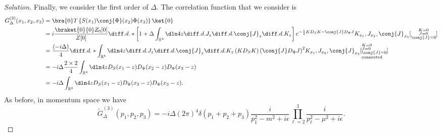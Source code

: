 \begin{proof}[Solution]
   Finally, we consider the first order of \(\Delta.\) The correlation function that we consider is
   \begin{align*}
      G_{\Delta}^{(3)}(x_1,x_2,x_3) &= \bra{0}T\left\{S(x_1)\conj{\Phi}(x_2) \Phi(x_3)\right\}\ket{0}\\
                                    &= i\frac{\braket{0}{0}Z_0[0]}{Z[0]} \diff.d.*{\left[1 + \Delta \int_{\mathbb{R}^4}\dln4z \diff.d.{}{J_z}\diff.d.{}{\conj{J}_z} \diff.d.{}{K_z}\right] e^{-\frac12 KD_SK - \conj{J}D_\Phi J}} {K_{x_1},J_{x_2},\conj{J}_{x_3}}[\substack{K=0\\J=0\\\conj{J}=0}]\\
                                    &= \frac{(-i\Delta)}{4} \diff.d.*{\int_{\mathbb{R}^4}\dln4z \diff.d.{}{J_z}\diff.d.{}{\conj{J}_z} \diff.d.{}{K_z}\left(KD_S K\right)\left(\conj{J}D_\Phi J\right)^2} {K_{x_1},J_{x_2},\conj{J}_{x_3}}[\begin{subarray}{l}K=0\\J=0\\\conj{J}=0\\\text{connected}\end{subarray}]\\
                                    &= -i \Delta \frac{2 \times 2}{4} \int_{\mathbb{R}^4} \dln4z D_S(x_1 - z) D_\Phi(x_2 - z) D_\Phi(x_3 - z)\\
                                    &= -i \Delta \int_{\mathbb{R}^4} \dln4z D_S(x_1 - z) D_\Phi(x_2 - z) D_\Phi(x_3 - z).
   \end{align*}
   As before, in momentum space we have
   \begin{equation*}
      \tilde{G}_{\Delta}^{(3)}(p_1, p_2, p_3) = - i \Delta (2\pi)^4 \delta(p_1 + p_2 + p_3) \frac{i}{p_1^2 - m^2 + i \epsilon}\prod_{\ell = 2}^3 \frac{i}{p_\ell^2 - \mu^2 + i \epsilon}.
   \end{equation*}


\end{proof}

